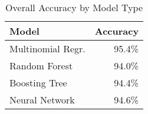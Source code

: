 \begin{table}[ht]
\centering
\caption{Overall Accuracy by Model Type}
\label{tab:overall}
\begin{tabular}{l|r}
 \hline
 \textbf{Model} & \textbf{Accuracy} \\
 \hline
 Multinomial Regr. & 95.4\% \\
 Random Forest & 94.0\% \\
 Boosting Tree & 94.4\% \\
 \hline
 Neural Network & 94.6\% \\
 \hline
\end{tabular}
\end{table}